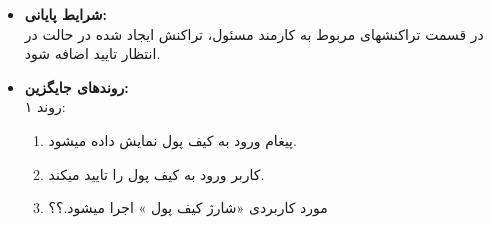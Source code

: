 \documentclass{article}
\begin{document}
\begin{itemize}
\begin{enumerate}
\end{enumerate}

\item \textbf{شرایط پایانی:}\\ 
در قسمت تراکنشهای مربوط به کارمند مسئول، تراکنش ایجاد شده در حالت در انتظار تایید اضافه شود.
\item \textbf{روندهای جایگزین:}\\
روند ۱:\\
\begin{enumerate}
\item پیغام ورود به کیف پول نمایش داده میشود.
\item کاربر ورود به کیف پول را تایید میکند.
\item مورد کاربردی «شارژ کیف پول » اجرا میشود.؟؟
\end{enumerate}

\end{itemize}


\noindent\makebox[\linewidth]{\rule{\paperwidth}{0.4pt}}
\end{document}
